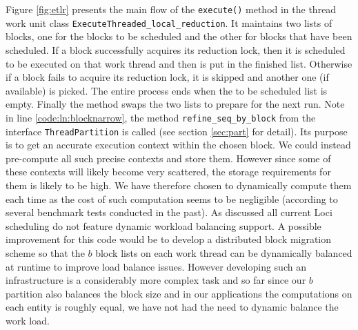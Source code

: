 \documentclass{article}
\begin{document}
Figure \ref{fig:etlr} presents the main flow of the
\lstinline{execute()} method in the thread work unit class
\lstinline{ExecuteThreaded_local_reduction}.  It maintains two lists of
blocks, one for the blocks to be scheduled and the other for blocks that
have been scheduled.  If a block successfully acquires its reduction
lock, then it is scheduled to be executed on that work thread and then
is put in the finished list.  Otherwise if a block fails to acquire its
reduction lock, it is skipped and another one (if available) is picked.
The entire process ends when the to be scheduled list is empty.  Finally
the method swaps the two lists to prepare for the next run.  Note in
line \ref{code:ln:blocknarrow}, the method
\lstinline{refine_seq_by_block} from the interface
\lstinline{ThreadPartition} is called (see section \ref{sec:part} for
detail).  Its purpose is to get an accurate execution context within the
chosen block.  We could instead pre-compute all such precise contexts
and store them.  However since some of these contexts will likely become
very scattered, the storage requirements for them is likely to be high.
We have therefore chosen to dynamically compute them each time as the
cost of such computation seems to be negligible (according to several
benchmark tests conducted in the past).  As discussed all current Loci
scheduling do not feature dynamic workload balancing support.  A
possible improvement for this code would be to develop a distributed
block migration scheme so that the $b$ block lists on each work thread
can be dynamically balanced at runtime to improve load balance issues.
However developing such an infrastructure is a considerably more complex
task and so far since our $b$ partition also balances the block size and
in our applications the computations on each entity is roughly equal, we
have not had the need to dynamic balance the work load.
\end{document}
